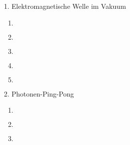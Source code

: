 \documentclass{alex_hü}
\begin{document}
\renewcommand{\labelenumi}{(\alph{enumi})}


\begin{mybox}{1. Elektromagnetische Welle im Vakuum}
	\centering \(  \)
	\tcblower
	\begin{enumerate}
		\item \(  \)
%			
	\tcbline
		\item \(  \)
%		
	\tcbline
		\item \(  \)
%			
	\tcbline
		\item \(  \)
	\tcbline
		\item \(  \)
	\end{enumerate}
\end{mybox}

\begin{mybox}{2. Photonen-Ping-Pong}
	\centering \(  \)
	\tcblower
	\begin{enumerate}
		\item \(  \)
	\tcbline
		\item \(  \)
	\tcbline
		\item \(  \)
	\end{enumerate}
\end{mybox}
\end{document}
